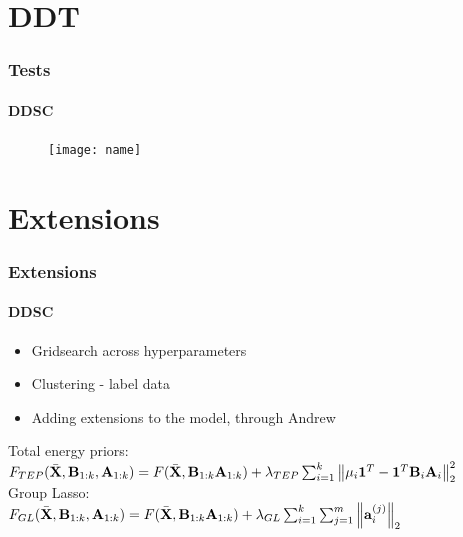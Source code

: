 \documentclass[gray]{beamer}
\begin{document}
\section{DDT}
\begin{frame}
	\frametitle{Tests}
	\framesubtitle{DDSC}
	\begin{figure}
		\centering
		\texttt{[image: name]}
	\end{figure}
\end{frame}
\section{Extensions}
\begin{frame}
	\frametitle{Extensions}
	\framesubtitle{DDSC}
	\begin{itemize}
		\item{Gridsearch across hyperparameters}
		\item{Clustering - label data}
		\item{Adding extensions to the model, through Andrew}
	\end{itemize}
	Total energy priors: \\
	\vspace{0.1in}
	$F_{TEP}(\bar{\mathbf{X}},\mathbf{B}_{1:k},\mathbf{A}_{1:k}) = F(\bar{\mathbf{X}},\mathbf{B}_{1:k} \mathbf{A}_{1:k}) + \lambda_{TEP}\sum_{i=1}^k \left\lVert\mu_i\mathbf{1}^T-\mathbf{1}^T\mathbf{B}_i\mathbf{A}_i\right\rVert^2_2$ \\
	\vspace{0.1in}
	Group Lasso: \\
	$F_{GL}(\bar{\mathbf{X}},\mathbf{B}_{1:k},\mathbf{A}_{1:k}) = F(\bar{\mathbf{X}},\mathbf{B}_{1:k} \mathbf{A}_{1:k}) + \lambda_{GL}\sum_{i=1}^k \sum_{j=1}^m \left\lVert\mathbf{a}_i^{(j)}\right\rVert_2$ \\
\end{frame}
\end{document}
